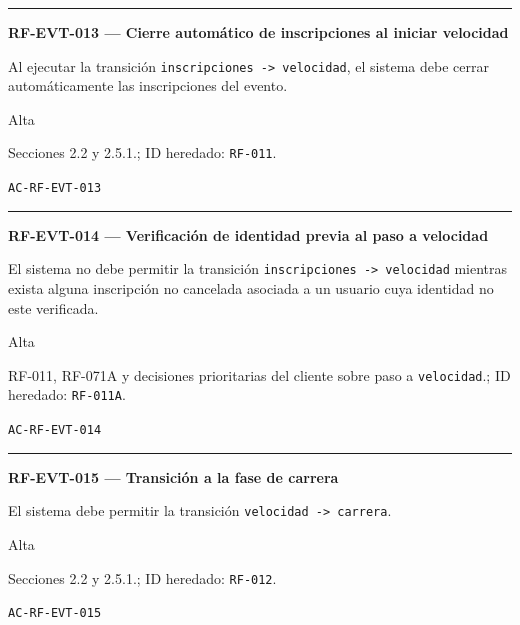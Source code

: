 \documentclass[10pt,letterpaper]{article}
\begin{document}
\vspace{0.25em}\hrule\vspace{0.65em}
\noindent\textbf{RF-EVT-013 --- Cierre automático de inscripciones al iniciar velocidad}\par
\begin{description}[style=nextline,leftmargin=3.15cm,labelwidth=2.8cm,font=\normalfont\bfseries]
\item[Obligación] Al ejecutar la transición \texttt{inscripciones -> velocidad}, el sistema debe cerrar automáticamente las inscripciones del evento.
\item[Prioridad] Alta
\item[Procedencia] Secciones 2.2 y 2.5.1.; ID heredado: \texttt{RF-011}.
\item[Verificación] \texttt{AC-RF-EVT-013}
\end{description}
\vspace{0.25em}\hrule\vspace{0.65em}
\noindent\textbf{RF-EVT-014 --- Verificación de identidad previa al paso a velocidad}\par
\begin{description}[style=nextline,leftmargin=3.15cm,labelwidth=2.8cm,font=\normalfont\bfseries]
\item[Obligación] El sistema no debe permitir la transición \texttt{inscripciones -> velocidad} mientras exista alguna inscripción no cancelada asociada a un usuario cuya identidad no este verificada.
\item[Prioridad] Alta
\item[Procedencia] RF-011, RF-071A y decisiones prioritarias del cliente sobre paso a \texttt{velocidad}.; ID heredado: \texttt{RF-011A}.
\item[Verificación] \texttt{AC-RF-EVT-014}
\end{description}
\vspace{0.25em}\hrule\vspace{0.65em}
\noindent\textbf{RF-EVT-015 --- Transición a la fase de carrera}\par
\begin{description}[style=nextline,leftmargin=3.15cm,labelwidth=2.8cm,font=\normalfont\bfseries]
\item[Obligación] El sistema debe permitir la transición \texttt{velocidad -> carrera}.
\item[Prioridad] Alta
\item[Procedencia] Secciones 2.2 y 2.5.1.; ID heredado: \texttt{RF-012}.
\item[Verificación] \texttt{AC-RF-EVT-015}
\end{description}
\end{document}

